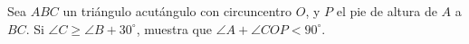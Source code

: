 Sea $ABC$ un triángulo acutángulo con circuncentro $O$, y $P$ el pie de altura de $A$ a $BC$. Si $\angle C \geq \angle B+30^{\circ}$, muestra que $\angle A+\angle COP \lt 90^{\circ}$.